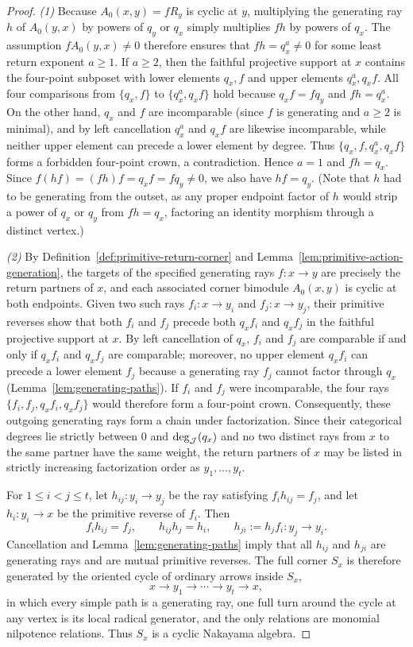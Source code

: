 \begin{proof}
\textit{(1)} Because $A_0(x,y)=fR_y$ is cyclic at $y$, multiplying the generating ray $h$ of $A_0(y,x)$ by powers of $q_y$ or $q_x$ simply multiplies $fh$ by powers of $q_x$. The assumption $fA_0(y,x)\ne0$ therefore ensures that $fh=q_x^a\ne0$ for some least return exponent $a\geq1$. If $a\geq2$, then the faithful projective support at $x$ contains the four-point subposet with lower elements $q_x,f$ and upper elements $q_x^a,q_xf$. All four comparisons from $\{q_x,f\}$ to $\{q_x^a,q_xf\}$ hold because $q_xf=fq_y$ and $fh=q_x^a$. On the other hand, $q_x$ and $f$ are incomparable (since $f$ is generating and $a\geq2$ is minimal), and by left cancellation $q_x^a$ and $q_xf$ are likewise incomparable, while neither upper element can precede a lower element by degree. Thus $\{q_x,f,q_x^a,q_xf\}$ forms a forbidden four-point crown, a contradiction. Hence $a=1$ and $fh=q_x$. Since $f(hf)=(fh)f=q_xf=fq_y\ne0$, we also have $hf=q_y$. (Note that $h$ had to be generating from the outset, as any proper endpoint factor of $h$ would strip a power of $q_x$ or $q_y$ from $fh=q_x$, factoring an identity morphism through a distinct vertex.)

\textit{(2)} By Definition~\ref{def:primitive-return-corner} and Lemma~\ref{lem:primitive-action-generation}, the targets of the specified generating rays $f\colon x\to y$ are precisely the return partners of $x$, and each associated corner bimodule $A_0(x,y)$ is cyclic at both endpoints. Given two such rays $f_i\colon x\to y_i$ and $f_j\colon x\to y_j$, their primitive reverses show that both $f_i$ and $f_j$ precede both $q_xf_i$ and $q_xf_j$ in the faithful projective support at $x$. By left cancellation of $q_x$, $f_i$ and $f_j$ are comparable if and only if $q_xf_i$ and $q_xf_j$ are comparable; moreover, no upper element $q_xf_i$ can precede a lower element $f_j$ because a generating ray $f_j$ cannot factor through $q_x$ (Lemma~\ref{lem:generating-paths}). If $f_i$ and $f_j$ were incomparable, the four rays $\{f_i,f_j,q_xf_i,q_xf_j\}$ would therefore form a four-point crown. Consequently, these outgoing generating rays form a chain under factorization. Since their categorical degrees lie strictly between $0$ and $\deg_\mathcal J(q_x)$ and no two distinct rays from $x$ to the same partner have the same weight, the return partners of $x$ may be listed in strictly increasing factorization order as $y_1,\ldots,y_t$.

For $1\leq i<j\leq t$, let $h_{ij}\colon y_i\to y_j$ be the ray satisfying $f_ih_{ij}=f_j$, and let $h_i\colon y_i\to x$ be the primitive reverse of $f_i$. Then
\[
  f_ih_{ij}=f_j,\qquad h_{ij}h_j=h_i,\qquad h_{ji}:=h_jf_i\colon y_j\to y_i.
\]
Cancellation and Lemma~\ref{lem:generating-paths} imply that all $h_{ij}$ and $h_{ji}$ are generating rays and are mutual primitive reverses. The full corner $S_x$ is therefore generated by the oriented cycle of ordinary arrows inside $S_x$,
\[
  x\to y_1\to\cdots\to y_t\to x,
\]
in which every simple path is a generating ray, one full turn around the cycle at any vertex is its local radical generator, and the only relations are monomial nilpotence relations. Thus $S_x$ is a cyclic Nakayama algebra.


\end{proof}
